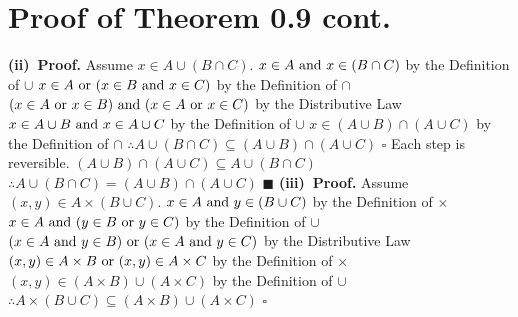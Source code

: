 \documentclass[12pt]{article}
\begin{document}
	\section[20pt]{Proof of Theorem 0.9 cont.}
	\textbf{(ii)\ Proof.}
	\newline
	Assume \(x \in A \cup (B \cap C)\). \newline
	\(x \in A \textup{ and } x \in (B \cap C)\) by the Definition of \(\cup\)
	\newline
	\(x \in A \textup{ or } (x \in B \textup{ and } x \in C)\) by the Definition of \(\cap\)
	\newline
	\((x \in A \textup{ or } x \in B) \textup{ and } (x \in A \textup{ or } x \in C)\) by the Distributive Law
	\newline
	\(x \in A \cup B \textup{ and } x \in A \cup C\) by the Definition of \(\cup\)
	\newline
	\(x \in (A \cup B) \cap (A \cup C)\) by the Definition of \(\cap\)
	\newline
	\(\therefore A \cup (B \cap C) \subseteq (A \cup B) \cap (A \cup C)\)
	\newline \(\square\) \newline
	Each step is reversible.
	\newline
	\((A \cup B) \cap (A \cup C) \subseteq A \cup (B \cap C)\)
	\newline
	\(\therefore A \cup (B \cap C) = (A \cup B) \cap (A \cup C)\)
	\newline \(\blacksquare\)
	\newline
	\newline
	\textbf{(iii)\ Proof.}
	\newline
	Assume \((x,y) \in A \times (B \cup C)\). \newline
	\(x \in A \textup{ and } y \in (B \cup C)\) by the Definition of \(\times\)
	\newline
	\(x \in A \textup{ and } (y \in B \textup{ or } y \in C)\) by the Definition of \(\cup\)
	\newline
	\((x \in A \textup{ and } y \in B) \textup{ or } (x \in A \textup{ and } y \in C)\) by the Distributive Law
	\newline
	\((x,y) \in A \times B \textup{ or } (x,y) \in A \times C\) by the Definition of \(\times\)
	\newline
	\((x,y) \in (A \times B) \cup (A \times C)\) by the Definition of \(\cup\)
	\newline
	\(\therefore A \times (B \cup C) \subseteq (A \times B) \cup (A \times C)\)
	\newline \(\square\) \newline
\end{document}
